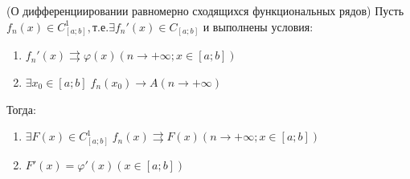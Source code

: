 \begin{Th}(О дифференциировании равномерно сходящихся функциональных рядов)
	Пусть $f_n(x) \in C_{[a;b]}^{1}, \text{т.е.} \exists f_n'(x) \in C_{[a;b]}$ и выполнены условия:\\
	\begin{enumerate}
		\item $f_n'(x) \rightrightarrows \varphi (x) (n \to +\infty; x \in [a;b])$
		\item $\exists x_0 \in [a;b] \; f_n(x_0) \rightarrow A (n \to +\infty)$
	\end{enumerate}
	Тогда:
	\begin{enumerate}
		\item $\exists F(x) \in C_{[a;b]}^{1} \; f_n(x) \rightrightarrows F(x) (n \to +\infty; x \in [a;b])$
		\item $F'(x) = \varphi'(x) (x \in [a;b])$
	\end{enumerate}
\end{Th}

